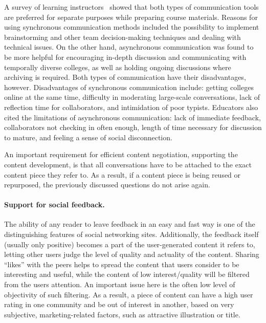 \documentclass[PhD, Submit, ngerman,UKenglish,table]{scrbook}
\begin{document}
A survey of learning instructors~\cite{branon2001synchronous} showed that both types of communication tools are preferred for separate purposes while preparing course materials.
Reasons for using synchronous communication methods included the possibility to implement brainstorming and other team decision-making techniques and dealing with technical issues.
On the other hand, asynchronous communication was found to be more helpful for encouraging in-depth discussion and communicating with temporally diverse colleges, as well as holding ongoing discussions where archiving is required. 
Both types of communication have their disadvantages, however. Disadvantages of synchronous communication include: getting colleges online at the same time, difficulty in moderating large-scale conversations, lack of reflection time for collaborators, and intimidation of poor typists.
Educators also cited the limitations of asynchronous communication: lack of immediate feedback, collaborators not checking in often enough, length of time necessary for discussion to mature, and feeling a sense of social disconnection.

An important requirement for efficient content negotiation, supporting the content development, is that all conversations have to be attached to the exact content piece they refer to.
As a result, if a content piece is being reused or repurposed, the previously discussed questions do not arise again.

\paragraph{Support for social feedback.}
The ability of any reader to leave feedback in an easy and fast way is one of the distinguishing features of social networking sites.
Additionally, the feedback itself (usually only positive) becomes a part of the user-generated content it refers to, letting other users judge the level of quality and actuality of the content.
Sharing ``likes'' with the peers helps to spread the content that users consider to be interesting and useful, while the content of low interest/quality will be filtered from the users attention. 
An important issue here is the often low level of objectivity of such filtering.
As a result, a piece of content can have a high user rating in one community and be out of interest in another, based on very subjective, marketing-related factors, such as attractive illustration or title.
\end{document}

